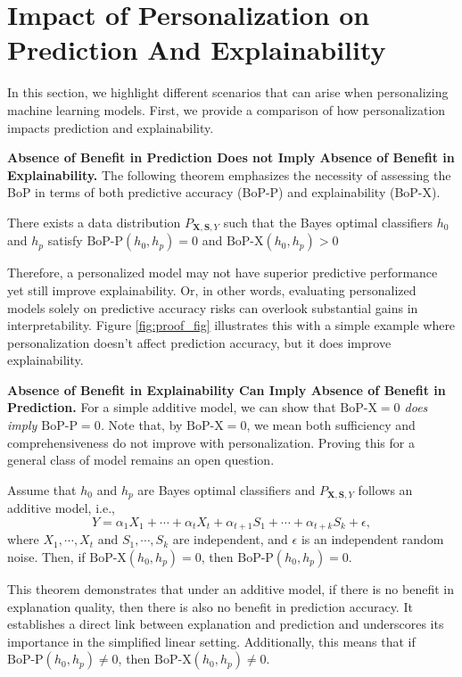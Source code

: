 
\section{Impact of Personalization on Prediction And Explainability}

In this section, we highlight different scenarios that can arise when personalizing machine learning models.
First, we provide a comparison of how personalization impacts prediction and explainability. 




\textbf{Absence of Benefit in Prediction Does not Imply Absence of Benefit in Explainability.} The following theorem emphasizes the necessity of assessing the BoP in terms of both predictive accuracy (BoP-P) and explainability (BoP-X). 
\begin{theorem} \label{thm:Bop_to_BopX}
    There exists a data distribution $P_{\mathbf{X}, \mathbf{S}, Y}$ such that  the Bayes optimal classifiers $h_0$ and $h_p$ satisfy $\text{BoP-P}(h_0, h_p) = 0$ and $\text{BoP-X}(h_0, h_p) > 0$ 
\end{theorem}

Therefore, a personalized model may not have superior predictive performance yet still improve explainability. Or, in other words, evaluating personalized models solely on predictive accuracy risks can overlook substantial gains in interpretability. Figure \ref{fig:proof_fig} illustrates this with a simple example where personalization doesn't affect prediction accuracy, but it does improve explainability.



\textbf{Absence of Benefit in Explainability Can Imply Absence of Benefit in Prediction.} For a simple additive model, we can show that \emph{$\text{BoP-X}=0$ does imply $\text{BoP-P}=0$.} Note that, by $\text{BoP-X}=0$, we mean both sufficiency and comprehensiveness do not improve with personalization. Proving this for a general class of model remains an open question. 
\begin{theorem}\label{thm:BopX_to_Bop}
Assume that $h_0$ and $h_p$ are Bayes optimal classifiers and $P_{\mathbf{X}, \mathbf{S}, Y}$ follows an additive model, i.e., 
\begin{equation}
    Y = \alpha_1 X_1 + \cdots + \alpha_t X_t + \alpha_{t+1} S_1 + \cdots + \alpha_{t+k} S_k + \epsilon, 
\end{equation}
where $X_1, \cdots, X_t$ and $S_1, \cdots, S_k$ are independent, and $\epsilon$ is an independent random noise. Then, if $\text{BoP-X}(h_0, h_p) = 0$, then $\text{BoP-P}(h_0, h_p) = 0$. 
\end{theorem} 

This theorem demonstrates that under an additive model, if there is no benefit in explanation quality, then there is also no benefit in prediction accuracy. It establishes a direct link between explanation and prediction and underscores its importance in the simplified linear setting. Additionally, this means that if $\text{BoP-P}(h_0, h_p) \neq 0$, then $\text{BoP-X}(h_0, h_p) \neq 0$.





